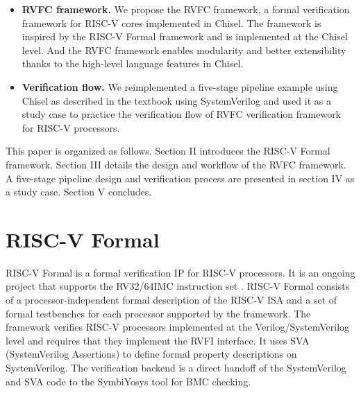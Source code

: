 \documentclass[conference]{IEEEtran}
\theoremstyle{definition}
\begin{document}
\begin{itemize}
    \item \textbf{RVFC framework.} 
    We propose the RVFC framework, a formal verification framework for RISC-V cores implemented in Chisel. The framework is inspired by the RISC-V Formal framework and is implemented at the Chisel level.
    And the RVFC framework enables modularity and better extensibility thanks to the high-level language features in Chisel.
    \item \textbf{Verification flow.}
    We reimplemented a five-stage pipeline example using Chisel as described in the textbook \cite{patterson2017computer} using SystemVerilog and used it as a study case to practice the verification flow of RVFC verification framework for RISC-V processors.
\end{itemize}

This paper is organized as follows. Section II introduces the RISC-V Formal framework. Section III details the design and workflow of the RVFC framework. 
A five-stage pipeline design and verification process are presented in section IV as a study case.
Section V concludes.

\section{RISC-V Formal}

RISC-V Formal is a formal verification IP for RISC-V processors.
It is an ongoing project that supports the RV32/64IMC instruction set \cite{riscvf}.
RISC-V Formal consists of a processor-independent formal description of the RISC-V ISA and a set of formal testbenches for each processor supported by the framework.
The framework verifies RISC-V processors implemented at the Verilog/SystemVerilog level and requires that they implement the RVFI interface.
It uses SVA (SystemVerilog Assertions) \cite{vijayaraghavan2005practical} to define formal property descriptions on SystemVerilog.
The verification backend is a direct handoff of the SystemVerilog and SVA code to the SymbiYosys \cite{SymbiYosys} tool for BMC checking.
\end{document}
